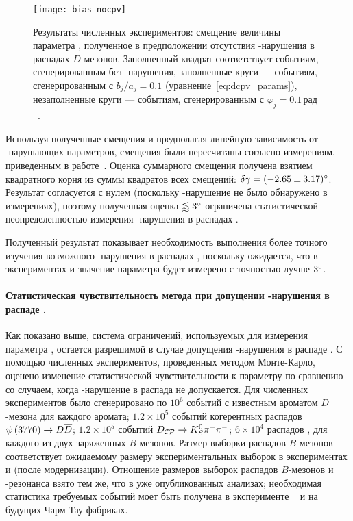 \begin{figure}[htb]
 \centering
  \texttt{[image: bias\_nocpv]}
 \caption{Результаты численных экспериментов: смещение величины параметра \gphi, полученное в предположении отсутствия \cpconj-нарушения в распадах $D$-мезонов.  Заполненный квадрат соответствует событиям, сгенерированным без \cpconj-нарушения, заполненные круги --- событиям, сгенерированным с $b_j/a_j=0.1$ (уравнение~\eqref{eq:dcpv_params}), незаполненные круги --- событиям, сгенерированным с $\varphi_j=0.1\,\textrm{рад}$~\cite{bdpv_cpv}.}
 \label{fig:gamma_dcpv}
\end{figure}

Используя полученные смещения и предполагая линейную зависимость от \cpconj-нарушающих параметров, смещения были пересчитаны согласно измерениям, приведенным в работе~\cite{cdf_kspp_cpv}.  Оценка суммарного смещения получена взятием квадратного корня из суммы квадратов всех смещений: $\delta\gamma = (-2.65\pm3.17)^{\circ}$.  Результат согласуется с нулем (поскольку \cpconj-нарушение не было обнаружено в измерениях), поэтому полученная оценка $\lessapprox3^{\circ}$ ограничена статистической неопределенностью измерения \cpconj-нарушения в распадах \dkpp.

Полученный результат показывает необходимость выполнения более точного изучения возможного \cpconj-нарушения в распадах \dkpp, поскольку ожидается, что в экспериментах \belleii и \lhcb значение параметра \gphi будет измерено с точностью лучше $3^{\circ}$.

\paragraph{\boldmath Статистическая чувствительность метода при допущении \cpconj-нарушения в распаде \dnkpp. }  Как показано выше, система ограничений, используемых для измерения параметра \gphi, остается разрешимой в случае допущения \cpconj-нарушения в распаде \dnkpp.  С помощью численных экспериментов, проведенных методом Монте-Карло, оценено изменение статистической чувствительности к параметру \gphi по сравнению со случаем, когда \cpconj-нарушение в распада \dnkpp не допускается.  
Для численных экспериментов было сгенерировано по $10^6$ событий \dkpp с известным ароматом $D$-мезона для каждого аромата; $1.2\times 10^5$ событий когерентных распадов $\psi\left(3770\right)\to D\overline{D}$; $1.2\times 10^5$ событий $D_{\mathcal{CP}}\to K_S^0\pi^+\pi^-$; $6\times 10^4$ распадов \bdk, \dkpp для каждого из двух заряженных $B$-мезонов.  Размер выборки распадов $B$-мезонов соответствует ожидаемому размеру экспериментальных выборок в экспериментах \belleii и \lhcb (после модернизации).  Отношение размеров выборок распадов $B$-мезонов и \ppsi-резонанса взято тем же, что в уже опубликованных анализах; необходимая статистика требуемых событий моет быть получена в эксперименте \besiii~\cite{besiii} и на будущих Чарм-Тау-фабриках.

